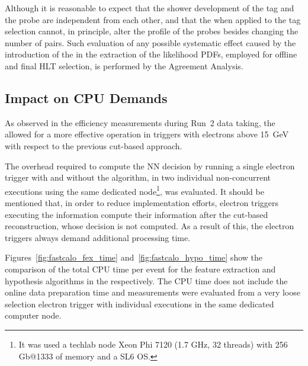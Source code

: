 Although it is reasonable to expect that the shower development of the tag and
the probe are independent from each other, and that the \rnn{} when applied to
the tag selection cannot, in principle, alter the profile of the probes besides
changing the number of \tnp{} pairs. Such evaluation of any possible systematic effect caused by the introduction of the \rnn{} in the extraction of the likelihood PDFs, employed for offline and final HLT selection, is performed by the Agreement Analysis.

\FloatBarrier
\subsection{Impact on CPU Demands} \label{ssec:cpu_reduction}

As observed in the efficiency measurements during Run~2 data taking, the \rnn{} allowed for a more effective \fastcalo{} operation in triggers with electrons above \SI{15}{\GeV}  with respect to the previous cut-based approach. 






The overhead required to compute the NN decision by running a single electron trigger with and without the \rnn algorithm, in two individual non-concurrent executions using the same dedicated node\footnote{It was used a techlab node Xeon Phi 7120 (1.7 GHz, 32 threads) with 256 Gb@1333 of memory and a SL6 OS.}, was evaluated. It should be mentioned that, in order to reduce implementation efforts, electron triggers executing the \rnn{} information compute their information after the cut-based reconstruction, whose decision is not computed. As a result of this, the \rnn{} electron 
triggers always demand additional \fastcalo processing time.

Figures~\ref{fig:fastcalo_fex_time} and~\ref{fig:fastcalo_hypo_time} show the comparison of the total CPU time per event for the feature extraction and hypothesis algorithms in the \fastcalo respectively.
The CPU time does not include the online data preparation time and measurements were evaluated from a very loose selection electron trigger with individual executions in the same dedicated computer node.


